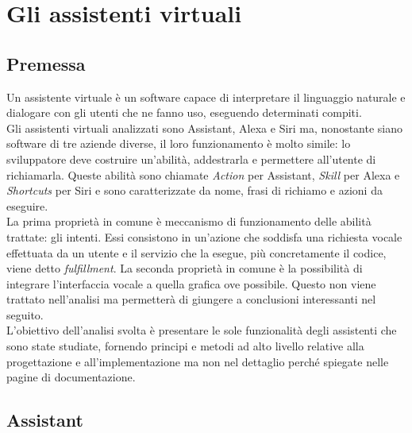 
\chapter{Gli assistenti virtuali}
\label{cap:descrizione-stage}


\section{Premessa}
Un assistente virtuale è un software capace di interpretare il linguaggio naturale e dialogare con gli utenti che ne fanno uso, eseguendo determinati compiti. \\
Gli assistenti virtuali analizzati sono Assistant, Alexa e Siri ma, nonostante siano software di tre aziende diverse, il loro funzionamento è molto simile: lo sviluppatore deve costruire un'abilità, addestrarla e permettere all'utente di richiamarla. Queste abilità sono chiamate \emph{Action} per Assistant, \emph{Skill} per Alexa e \emph{Shortcuts} per Siri e sono caratterizzate da nome, frasi di richiamo e azioni da eseguire. \\
La prima proprietà in comune è meccanismo di funzionamento delle abilità trattate: gli intenti. Essi consistono in un'azione che soddisfa una richiesta vocale effettuata da un utente e il servizio che la esegue, più concretamente il codice, viene detto \emph{fulfillment}. La seconda proprietà in comune è la possibilità di integrare l'interfaccia vocale a quella grafica ove possibile. Questo non viene trattato nell'analisi ma permetterà di giungere a conclusioni interessanti nel seguito. \\
L'obiettivo dell'analisi svolta è presentare le sole funzionalità degli assistenti che sono state studiate, fornendo principi e metodi ad alto livello relative alla progettazione e all'implementazione ma non nel dettaglio perché spiegate nelle pagine di documentazione.

\section{Assistant}

